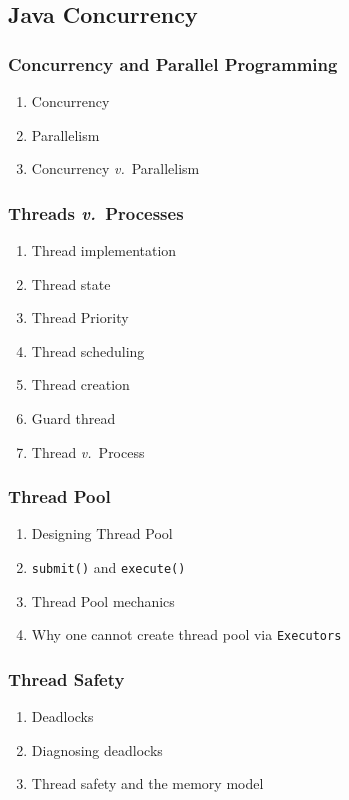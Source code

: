 \documentclass[11pt, twocolumn]{article}
\newcommand{\versus}{\textit{v.}\ }
\begin{document}
\subsection{Java Concurrency}

\subsubsection{Concurrency and Parallel Programming}
\begin{enumerate}
	\item Concurrency
	\item Parallelism
	\item Concurrency \versus Parallelism
\end{enumerate}

\subsubsection{Threads \versus Processes}
\begin{enumerate}
	\item Thread implementation
	\item Thread state
	\item Thread Priority
	\item Thread scheduling
	\item Thread creation
	\item Guard thread
	\item Thread \versus Process
\end{enumerate}

\subsubsection{Thread Pool}
\begin{enumerate}
	\item Designing Thread Pool
	\item \texttt{submit()} and \texttt{execute()}
	\item Thread Pool mechanics
	\item Why one cannot create thread pool via \texttt{Executors}
\end{enumerate}

\subsubsection{Thread Safety}
\begin{enumerate}
	\item Deadlocks
	\item Diagnosing deadlocks
	\item Thread safety and the memory model
\end{enumerate}
\end{document}
